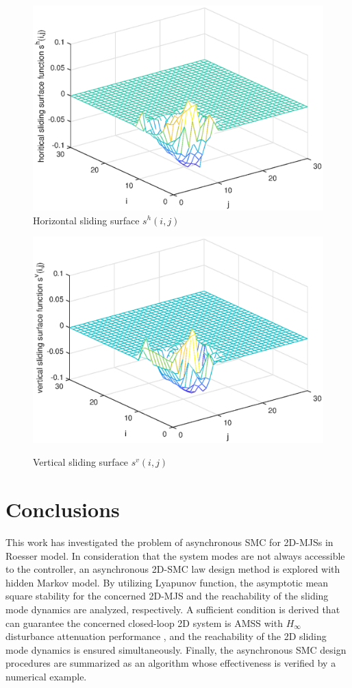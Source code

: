 \documentclass[journal,final,twocolumn]{IEEEtran}
\begin{document}
\begin{figure}[!htb]
	\centering\includegraphics[scale=0.6]{./simulations/hs_eps.eps}
	\caption{Horizontal  sliding surface $s^{h}(i,j)$}
	\label{fig9}
\end{figure}
\begin{figure}[!htb]
	\centering\includegraphics[scale=0.6]{./simulations/vs_eps.eps}\\ 
	\caption{Vertical sliding surface $s^{v}(i,j)$}
	\label{fig10}
\end{figure}


\section{Conclusions} \label{conclusion} 
This work has investigated the problem of asynchronous SMC for 2D-MJSs in Roesser model. In consideration that the system modes are not always accessible to the controller, an asynchronous 2D-SMC law design method is explored with hidden Markov model. By utilizing Lyapunov function, the asymptotic mean square stability for the concerned 2D-MJS  and the reachability of the sliding mode dynamics are analyzed, respectively. A sufficient condition is derived that can guarantee the concerned closed-loop 2D system is AMSS with $H_{\infty}$ disturbance attenuation performance , and  the reachability of the 2D sliding mode dynamics is ensured simultaneously. Finally, the asynchronous SMC design procedures are summarized as an algorithm whose effectiveness is verified by a numerical example.
\end{document}
